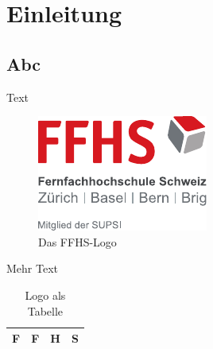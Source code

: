 \chapter{Einleitung}
\section{Abc}

Text

\begin{figure}[ht]
  \begin{center}
  \includegraphics{ffhslogo}
  \end{center}
  \caption{Das FFHS-Logo}
\end{figure}


Mehr Text\cite[p.~55]{Humble}
 
\begin{table}[ht]
  \begin{center}
  \begin{tabular}{|c|c|c|c|}
  \hline
  F & F & H & S \\
  \hline
  \end{tabular}
  \end{center}
  \caption{Logo als Tabelle}
\end{table}
